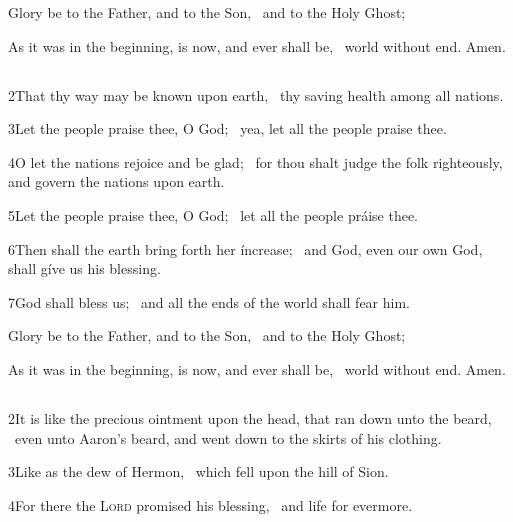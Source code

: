 Glory be to the Father, and to the Son, \star\  and to the Holy Ghost;

As it was in the beginning, is now, and ever shall be, \star\  world without end. Amen.

\medskip
\centerline{}
\subsection[{Psalm 67}]{}

2\enspace That thy way may be known upon earth, \star\ thy saving health among all nations.

3\enspace Let the people praise thee, O God; \star\ yea, let all the people praise thee.

4\enspace O let the nations rejoice and be glad; \star\ for thou shalt judge the folk righteously, and govern the nations upon earth.

5\enspace Let the people praise thee, O God; \star\ let all the people práise thee.

6\enspace Then shall the earth bring forth her íncrease; \star\ and God, even our own God, shall gíve us his blessing.

7\enspace God shall bless us; \star\ and all the ends of the world shall fear him.

Glory be to the Father, and to the Son, \star\  and to the Holy Ghost;

As it was in the beginning, is now, and ever shall be, \star\  world without end. Amen.


\medskip
\centerline{}
\subsection[{Psalm 133}]{}

2\enspace It is like the precious ointment upon the head, that ran down unto the beard, \star\ even unto Aaron’s beard, and went down to the skirts of his clothing.

3\enspace Like as the dew of Hermon, \star\ which fell upon the hill of Sion.

4\enspace For there the {\scshape Lord} promised his blessing, \star\ and life for evermore.

